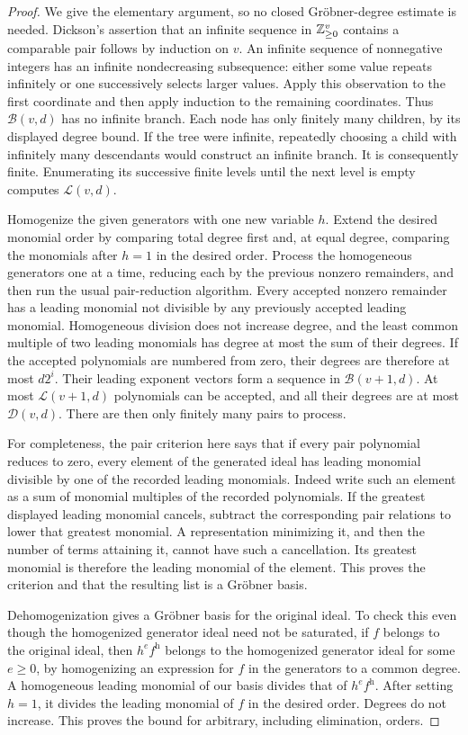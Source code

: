 \begin{proof}
We give the elementary argument, so no closed Gr\"obner-degree
estimate is needed.  Dickson's assertion that an infinite
sequence in $\mathbb Z_{\geq0}^v$ contains a comparable pair follows
by induction on $v$.  An infinite sequence of nonnegative
integers has an infinite nondecreasing subsequence: either some
value repeats infinitely or one successively selects larger
values.  Apply this observation to the first coordinate and
then apply induction to the remaining coordinates.  Thus
$\mathcal B(v,d)$ has no infinite branch.  Each node has only
finitely many children, by its displayed degree bound.
If the tree were infinite, repeatedly choosing a child with
infinitely many descendants would construct an infinite branch.
It is consequently finite.  Enumerating its successive finite
levels until the next level is empty computes $\mathcal L(v,d)$.

Homogenize the given generators with one new variable $h$.
Extend the desired monomial order by comparing total degree
first and, at equal degree, comparing the monomials after
$h=1$ in the desired order.  Process the homogeneous generators
one at a time, reducing each by the previous nonzero remainders,
and then run the usual pair-reduction algorithm.  Every accepted
nonzero remainder has a leading monomial not divisible by any
previously accepted leading monomial.  Homogeneous division
does not increase degree, and the least common multiple of
two leading monomials has degree at most the sum of their
degrees.  If the accepted polynomials are numbered from zero,
their degrees are therefore at most $d2^i$.  Their leading
exponent vectors form a sequence in $\mathcal B(v+1,d)$.
At most $\mathcal L(v+1,d)$ polynomials can be accepted, and
all their degrees are at most $\mathcal D(v,d)$.
There are then only finitely many pairs to process.

For completeness, the pair criterion here says that if every
pair polynomial reduces to zero, every element of the generated
ideal has leading monomial divisible by one of the recorded
leading monomials.  Indeed write such an element as a sum of
monomial multiples of the recorded polynomials.  If the greatest
displayed leading monomial cancels, subtract the corresponding
pair relations to lower that greatest monomial.  A representation
minimizing it, and then the number of terms attaining it, cannot
have such a cancellation.  Its greatest monomial is therefore
the leading monomial of the element.  This proves the criterion
and that the resulting list is a Gr\"obner basis.

Dehomogenization gives a Gr\"obner basis for the original ideal.
To check this even though the homogenized generator ideal need
not be saturated, if $f$ belongs to the original ideal, then
$h^e f^{\mathrm h}$ belongs to the homogenized generator ideal
for some $e\geq0$, by homogenizing an expression for $f$ in
the generators to a common degree.  A homogeneous leading
monomial of our basis divides that of $h^e f^{\mathrm h}$.
After setting $h=1$, it divides the leading monomial of $f$
in the desired order.  Degrees do not increase.  This proves
the bound for arbitrary, including elimination, orders.
\end{proof}

